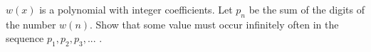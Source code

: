 $w(x)$ is a polynomial with integer coefficients. Let $p_n$ be the sum of the digits of the number $w(n)$. Show that some value must occur infinitely often in the sequence $p_1, p_2, p_3, ...$ .